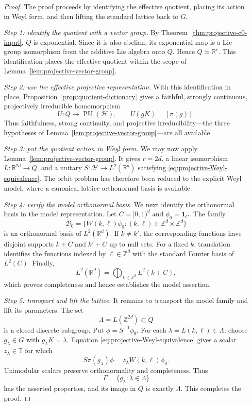 \documentclass[reqno]{amsart}
\numberwithin{equation}{section}
\theoremstyle{definition}
\theoremstyle{remark}
\newcommand{\cH}{\mathcal H}
\newcommand{\R}{\mathbb R}
\newcommand{\T}{\mathbb T}
\newcommand{\PU}{\operatorname{PU}}
\newcommand{\Step}[1]{\par\medskip\noindent\textit{#1.}\quad}
\begin{document}
\begin{proof}
The proof proceeds by identifying the effective quotient, placing its action
in Weyl form, and then lifting the standard lattice back to $G$.

\Step{Step 1: identify the quotient with a vector group}
By Theorem~\ref{thm:projective-c0-input}, $Q$ is exponential.  Since it is
also abelian, its exponential map is a Lie-group isomorphism from the
additive Lie algebra onto $Q$.  Hence $Q\simeq\R^r$.  This identification
places the effective quotient within the scope of
Lemma~\ref{lem:projective-vector-group}.

\Step{Step 2: use the effective projective representation}
With this identification in place,
Proposition~\ref{prop:quotient-dictionary} gives a faithful, strongly
continuous, projectively irreducible homomorphism
\[
 U:Q\longrightarrow\PU(\cH),
 \qquad U(gK)=[\pi(g)].
\]
Thus faithfulness, strong continuity, and projective irreducibility---the
three hypotheses of Lemma~\ref{lem:projective-vector-group}---are all
available.

\Step{Step 3: put the quotient action in Weyl form}
We may now apply Lemma~\ref{lem:projective-vector-group}.  It gives $r=2d$,
a linear isomorphism
$L:\R^{2d}\to Q$, and a unitary $S:\cH\to L^2(\R^d)$ satisfying
\eqref{eq:projective-Weyl-equivalence}.  The orbit problem has therefore been
reduced to the explicit Weyl model, where a canonical lattice orthonormal
basis is available.

\Step{Step 4: verify the model orthonormal basis}
We next identify the orthonormal basis in the model representation.  Let
$C=[0,1)^d$ and $\phi_0=\mathbf1_C$.  The family
\begin{equation}\label{eq:Gabor-ONB}
 \mathcal B_0
 =\{W(k,\ell)\phi_0:(k,\ell)\in\mathbb Z^d\times\mathbb Z^d\}
\end{equation}
is an orthonormal basis of $L^2(\R^d)$.  If $k\neq k'$, the corresponding
functions have disjoint supports $k+C$ and $k'+C$ up to null sets.  For a
fixed $k$, translation identifies the functions indexed by
$\ell\in\mathbb Z^d$ with the standard Fourier basis of $L^2(C)$.  Finally,
\[
 L^2(\R^d)=\bigoplus_{k\in\mathbb Z^d}L^2(k+C),
\]
which proves completeness and hence establishes the model assertion.

\Step{Step 5: transport and lift the lattice}
It remains to transport the model family and lift its parameters.  The set
\begin{equation}\label{eq:quotient-lattice}
 \Lambda=L(\mathbb Z^{2d})\subset Q
\end{equation}
is a closed discrete subgroup.  Put $\phi=S^{-1}\phi_0$.  For each
$\lambda=L(k,\ell)\in\Lambda$, choose $g_\lambda\in G$ with
$g_\lambda K=\lambda$.  Equation
\eqref{eq:projective-Weyl-equivalence} gives a scalar $z_\lambda\in\T$ for
which
\begin{equation}\label{eq:lifted-Weyl-atom}
 S\pi(g_\lambda)\phi=z_\lambda W(k,\ell)\phi_0.
\end{equation}
Unimodular scalars preserve orthonormality and completeness.  Thus
\[
 \Gamma=\{g_\lambda:\lambda\in\Lambda\}
\]
has the asserted properties, and its image in $Q$ is exactly $\Lambda$.
This completes the proof.
\end{proof}
\end{document}
